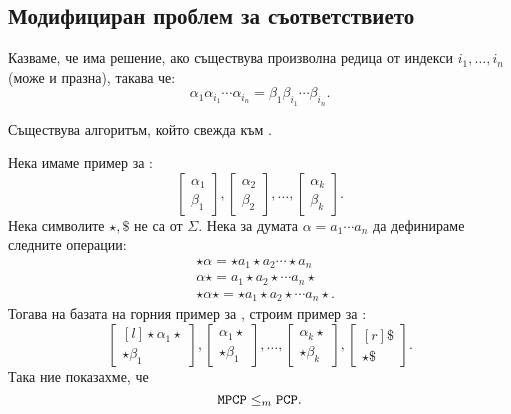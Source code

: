 \subsection*{Модифициран проблем за съответствието }

Казваме, че \MPCP има решение, ако съществува произволна редица от индекси $i_1,\dots,i_n$ (може и празна), такава че:
\[\alpha_1\alpha_{i_1}\cdots\alpha_{i_n} = \beta_1\beta_{i_1}\cdots\beta_{i_n}.\]

\begin{lemma}
  Съществува алгоритъм, който свежда \MPCP към \PCP.
\end{lemma}
\begin{hint}
  Нека имаме пример за \MPCP:
  \[\begin{bmatrix} \alpha_1\\ \beta_1\end{bmatrix},\begin{bmatrix} \alpha_2\\ \beta_2\end{bmatrix},\dots,\begin{bmatrix} \alpha_k\\ \beta_k\end{bmatrix} .\]
  Нека символите $\star,\$$ не са от $\Sigma$.
  Нека за думата $\alpha = a_1\cdots a_n$ да дефинираме следните операции:
  \begin{align*}
    & \star\alpha = \star a_1 \star a_2\cdots \star a_n\\
    & \alpha\star = a_1\star a_2\star\cdots a_n \star\\
    & \star\alpha\star = \star a_1\star a_2 \star \cdots a_n\star.
  \end{align*}
  Тогава на базата на горния пример за \MPCP, строим пример за \PCP:
  \[\begin{bmatrix*}[l] \star\alpha_1\star\\ \star\beta_1\end{bmatrix*},\begin{bmatrix} \alpha_1\star\\ \star \beta_1\end{bmatrix},\dots,\begin{bmatrix} \alpha_k\star\\ \star\beta_k\end{bmatrix},\begin{bmatrix*}[r] \$\\ \star\$\end{bmatrix*}.\]
  Така ние показахме, че
  \[\texttt{MPCP} \leq_m \texttt{PCP}.\]
\end{hint}

